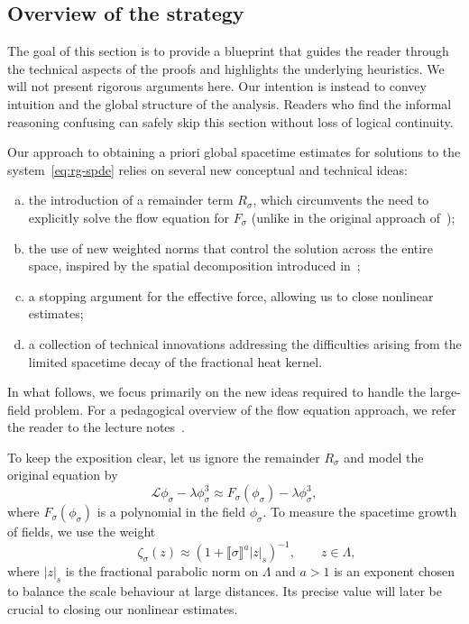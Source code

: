 \documentclass{article}
\numberwithin{equation}{section}
\theoremstyle{plain}
\theoremstyle{definition}
\begin{document}
\subsection{Overview of the strategy}

The goal of this section is to provide a blueprint that guides the reader
through the technical aspects of the proofs and highlights the underlying
heuristics. We will not present rigorous arguments here. Our intention is
instead to convey intuition and the global structure of the analysis. Readers
who find the informal reasoning confusing can safely skip this section without
loss of logical continuity.

Our approach to obtaining a priori global spacetime estimates for solutions to
the system~\eqref{eq:rg-spde} relies on several new conceptual and technical
ideas:
\begin{enumerate}[(a)]
  \item the introduction of a remainder term $R_{\sigma}$, which circumvents
  the need to explicitly solve the flow equation for $F_{\sigma}$ (unlike in
  the original approach
  of~{\cite{duchFlowEquationApproach2021,duchRenormalizationSingularElliptic2022}});
  
  \item the use of new weighted norms that control the solution across the
  entire space, inspired by the spatial decomposition introduced
  in~{\cite{gubinelliGlobalSolutionsElliptic2019}};
  
  \item a stopping argument for the effective force, allowing us to close
  nonlinear estimates;
  
  \item a collection of technical innovations addressing the difficulties
  arising from the limited spacetime decay of the fractional heat kernel.
\end{enumerate}
In what follows, we focus primarily on the new ideas required to handle the
large-field problem. For a pedagogical overview of the flow equation approach,
we refer the reader to the lecture notes~{\cite{duch-notes}}.

To keep the exposition clear, let us ignore the remainder $R_{\sigma}$ and
model the original equation by
\begin{equation}
  \mathcal{L} \phi_{\sigma} - \lambda \phi_{\sigma}^3 \approx F_{\sigma}
  (\phi_{\sigma}) - \lambda \phi_{\sigma}^3, \label{eq:model-coerc}
\end{equation}
where $F_{\sigma} (\phi_{\sigma})$ is a polynomial in the field
$\phi_{\sigma}$. To measure the spacetime growth of fields, we use the weight
\[ \qquad \zeta_{\sigma} (z) \approx (1 + \llbracket \sigma \rrbracket^a | z
   |_s )^{- 1}, \qquad z \in \Lambda, \]
where $| z |_s$ is the fractional parabolic norm on $\Lambda$ and $a > 1$
is an exponent chosen to balance the scale behaviour at large distances. Its
precise value will later be crucial to closing our nonlinear estimates.
\end{document}
